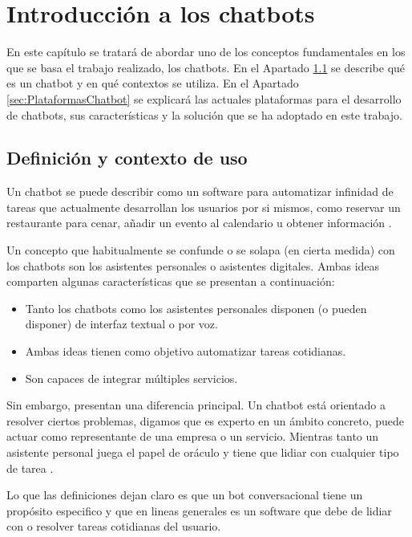 \chapter{Introducción a los chatbots}
\label{cha:IntroChatbot}

En este capítulo se tratará de abordar uno de los conceptos fundamentales en los que se basa el trabajo realizado, los chatbots. En el Apartado \ref{sec:DefinicionChatbot} se describe qué es un chatbot y en qué contextos se utiliza. En el Apartado \ref{sec:PlataformasChatbot} se explicará las actuales plataformas para el desarrollo de chatbots, sus características y la solución que se ha adoptado en este trabajo.

\section{Definición y contexto de uso}
\label{sec:DefinicionChatbot}

Un chatbot se puede describir como un software para automatizar infinidad de tareas que actualmente desarrollan los usuarios por si mismos, como reservar un restaurante para cenar, añadir un evento al calendario u obtener información \cite{Wagner2016}.

Un concepto que habitualmente se confunde o se solapa (en cierta medida) con los chatbots son los asistentes personales o asistentes digitales. Ambas ideas comparten algunas características que se presentan a continuación:
\begin{itemize}
	\item Tanto los chatbots como los asistentes personales disponen (o pueden disponer) de interfaz textual o por voz.
	\item Ambas ideas tienen como objetivo automatizar tareas cotidianas.
	\item Son capaces de integrar múltiples servicios.
\end{itemize}

Sin embargo, presentan una diferencia principal. Un chatbot está orientado a resolver ciertos problemas, digamos que es experto en un ámbito concreto, puede actuar como representante de una empresa o un servicio. Mientras tanto un asistente personal juega el papel de oráculo y tiene que lidiar con cualquier tipo de tarea \cite{Wright2016}.

Lo que las definiciones dejan claro es que un bot conversacional tiene un propósito especifico y que en lineas generales es un software que debe de lidiar con o resolver tareas cotidianas del usuario.

